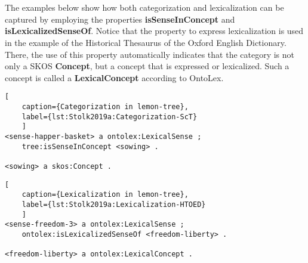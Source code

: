 \\

\\

The examples below show how both categorization and lexicalization can be captured by employing the properties \textbf{isSenseInConcept} and \textbf{isLexicalizedSenseOf}. 
Notice that the property to express lexicalization is used in the example of the Historical Thesaurus of the Oxford English Dictionary. 
There, the use of this property automatically indicates that the category is not only a SKOS \textbf{Concept}, but a concept that is expressed or lexicalized. 
Such a concept is called a \textbf{LexicalConcept} according to OntoLex. 

\noindent
\begin{minipage}[c]{\textwidth}
	\begin{lstlisting}[
	caption={Categorization in lemon-tree},
	label={lst:Stolk2019a:Categorization-ScT}
	]
<sense-happer-basket> a ontolex:LexicalSense ;
	tree:isSenseInConcept <sowing> .

<sowing> a skos:Concept .
	\end{lstlisting}
\end{minipage}

\noindent
\begin{minipage}[c]{\textwidth}
	\begin{lstlisting}[
	caption={Lexicalization in lemon-tree},
	label={lst:Stolk2019a:Lexicalization-HTOED}
	]
<sense-freedom-3> a ontolex:LexicalSense ;
	ontolex:isLexicalizedSenseOf <freedom-liberty> .

<freedom-liberty> a ontolex:LexicalConcept .
	\end{lstlisting}
\end{minipage}

